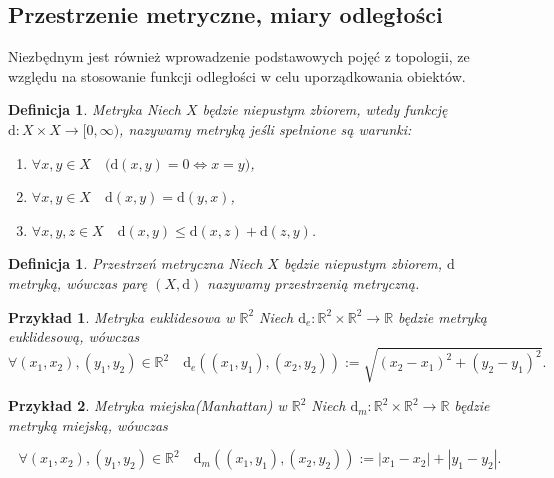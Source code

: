 \documentclass[12pt,a4paper]{report}
\newtheorem{definition}[theorem]{Definicja}
\newtheorem{example}{Przykład}
\begin{document}
\subsection{Przestrzenie metryczne, miary odległości}


Niezbędnym jest również wprowadzenie podstawowych pojęć z topologii, ze względu na stosowanie funkcji odległości w celu uporządkowania obiektów.


\begin{definition}{Metryka \cite[Rozdzial 9]{kuratowski2004}}
Niech $X$ będzie niepustym zbiorem, wtedy funkcję $\mathrm{d}: X \times X \rightarrow [0,\infty)$, nazywamy metryką jeśli spełnione są warunki:
\begin{enumerate}
\item $\forall x, y \in X \quad \big(\mathrm{d}(x,y) = 0  \Longleftrightarrow x=y \big)$,
\item $\forall x, y \in X \quad \mathrm{d}(x,y)=\mathrm{d}(y,x)$,
\item $\forall  x, y, z \in X \quad \mathrm{d}(x,y)\leq \mathrm{d}(x,z)+\mathrm{d}(z,y)$.
\end{enumerate}
\end{definition}


\begin{definition}{Przestrzeń metryczna \cite[Rozdział 9]{kuratowski2004}}
Niech $X$ będzie niepustym zbiorem, $\mathrm{d}$ metryką, wówczas parę $(X,\mathrm{d})$ nazywamy przestrzenią metryczną. 
\end{definition}


\begin{example}{Metryka euklidesowa w $\mathbb{R}^2$}
Niech $\mathrm{d}_e: \mathbb{R}^2 \times \mathbb{R}^2 \rightarrow \mathbb{R}$ będzie metryką euklidesową, wówczas
$$\forall{(x_{1},x_{2}),(y_{1},y_{2}) \in \mathbb{R}^2} \quad \mathrm{d}_e((x_1,y_1),(x_2,y_2)):= \sqrt{(x_2-x_1)^2+(y_2-y_1)^2}. $$
\end{example}


\begin{example}{Metryka miejska(Manhattan) w $\mathbb{R}^2$}
Niech $\mathrm{d}_m: \mathbb{R}^2 \times \mathbb{R}^2 \rightarrow \mathbb{R}$ będzie metryką miejską, wówczas 

$$\forall{(x_{1},x_{2}),(y_{1},y_{2}) \in \mathbb{R}^2} \quad \mathrm{d}_m((x_1,y_1),(x_2,y_2)):=|x_1-x_2|+|y_1-y_2|.$$

\end{example}
\end{document}
